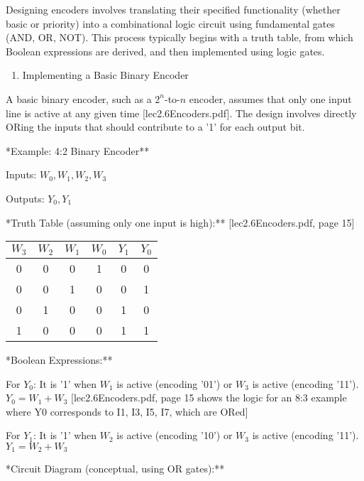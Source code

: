 \documentclass{article}
\begin{document}
Designing encoders involves translating their specified functionality (whether basic or priority) into a combinational logic circuit using fundamental gates (AND, OR, NOT). This process typically begins with a truth table, from which Boolean expressions are derived, and then implemented using logic gates.

\begin{enumerate}
\item Implementing a Basic Binary Encoder

\end{enumerate}
A basic binary encoder, such as a $2^n$-to-$n$ encoder, assumes that only one input line is active at any given time [lec2.6Encoders.pdf]. The design involves directly ORing the inputs that should contribute to a '1' for each output bit.

\item **Example: 4:2 Binary Encoder**

    \item Inputs: $W_0, W_1, W_2, W_3$

    \item Outputs: $Y_0, Y_1$

    \item **Truth Table (assuming only one input is high):** [lec2.6Encoders.pdf, page 15] \begin{tabular}{|cccc|cc|} \\ \hline $W_3$ & $W_2$ & $W_1$ & $W_0$ & $Y_1$ & $Y_0$ \\ \hline
 0 & 0 & 0 & 1 & 0 & 0 \\ 0 & 0 & 1 & 0 & 0 & 1 \\ 0 & 1 & 0 & 0 & 1 & 0 \\ 1 & 0 & 0 & 0 & 1 & 1 \\ \hline

\end{tabular}


    \item **Boolean Expressions:**

         For $Y_0$: It is '1' when $W_1$ is active (encoding '01') or $W_3$ is active (encoding '11'). $Y_0 = W_1 + W_3$ [lec2.6Encoders.pdf, page 15 shows the logic for an 8:3 example where Y0 corresponds to I1, I3, I5, I7, which are ORed]

         For $Y_1$: It is '1' when $W_2$ is active (encoding '10') or $W_3$ is active (encoding '11'). $Y_1 = W_2 + W_3$

    \item **Circuit Diagram (conceptual, using OR gates):** 
\end{document}
